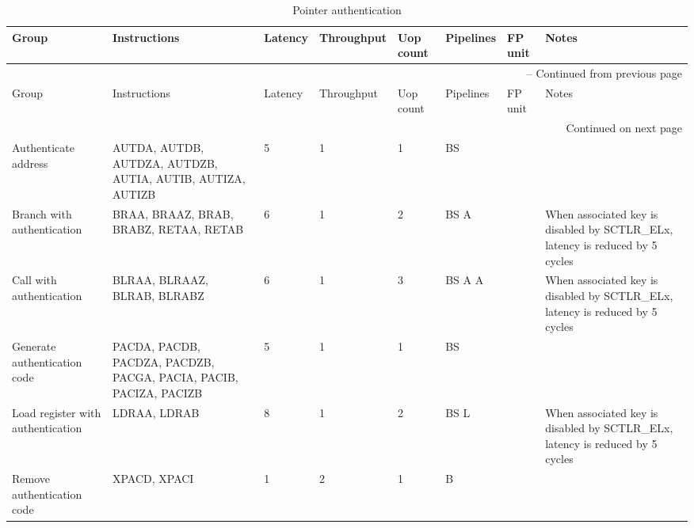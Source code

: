 \begin{longtable}{|p{1in}|p{1in}|l|l|l|p{1in}|l|p{1in}|}
\caption{Pointer authentication} \\
\hline
Group & Instructions & Latency & Throughput & Uop count & Pipelines & FP unit & Notes\\
\hline
\endfirsthead
\hline
\multicolumn{8}{|r|}{{\tablename\ \thetable{} -- Continued from previous page}} \\
\hline
Group & Instructions & Latency & Throughput & Uop count & Pipelines & FP unit & Notes\\
\hline
\endhead
\hline
\multicolumn{8}{|r|}{{Continued on next page}} \\
\hline
\endfoot
\hline
\endlastfoot
Authenticate address & AUTDA, AUTDB, AUTDZA, AUTDZB, AUTIA, AUTIB, AUTIZA, AUTIZB & 5 & 1 & 1 & BS &  & \\
\hline
Branch with authentication & BRAA, BRAAZ, BRAB, BRABZ, RETAA, RETAB & 6 & 1 & 2 & BS A &  & When associated key is disabled by SCTLR\_ELx, latency is reduced by 5 cycles\\
\hline
Call with authentication & BLRAA, BLRAAZ, BLRAB, BLRABZ & 6 & 1 & 3 & BS A A &  & When associated key is disabled by SCTLR\_ELx, latency is reduced by 5 cycles\\
\hline
Generate authentication code & PACDA, PACDB, PACDZA, PACDZB, PACGA, PACIA, PACIB, PACIZA, PACIZB & 5 & 1 & 1 & BS &  & \\
\hline
Load register with authentication & LDRAA, LDRAB & 8 & 1 & 2 & BS L &  & When associated key is disabled by SCTLR\_ELx, latency is reduced by 5 cycles\\
\hline
Remove authentication code & XPACD, XPACI & 1 & 2 & 1 & B &  & \\
\hline
\end{longtable}
